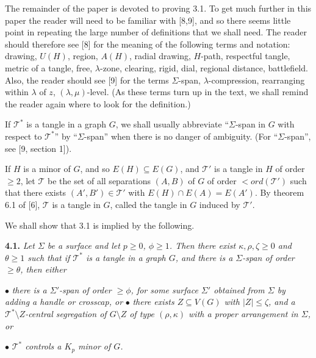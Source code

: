 The remainder of the paper is devoted to proving 3.1. To get much further in this paper the reader will need to be familiar with [8,9], and so there seems little point in repeating the large number of definitions that we shall need. The reader should therefore see [8] for the meaning of the following terms and notation: drawing, $U(H)$, region, $A(H)$, radial drawing, $H$-path, respectful tangle, metric of a tangle, free, $\lambda$-zone, clearing, rigid, dial, regional distance, battlefield. Also, the reader should see [9] for the terms $\Sigma$-span, $\lambda$-compression, rearranging within $\lambda$ of $z$, $(\lambda, \mu)$-level. (As these terms turn up in the text, we shall remind the reader again where to look for the definition.)

If $\mathscr{T}^*$ is a tangle in a graph $G$, we shall usually abbreviate ``$\Sigma$-span in $G$ with respect to $\mathscr{T}^*$'' by ``$\Sigma$-span'' when there is no danger of ambiguity. (For ``$\Sigma$-span'', see [9, section 1]).

If $H$ is a minor of $G$, and so $E(H) \subseteq E(G)$, and $\mathscr{T}'$ is a tangle in $H$ of order $\ge 2$, let $\mathscr{T}$ be the set of all separations $(A, B)$ of $G$ of order $< ord(\mathscr{T}')$ such that there exists $(A', B') \in \mathscr{T}'$ with $E(H) \cap E(A) = E(A')$. By theorem 6.1 of [6], $\mathscr{T}$ is a tangle in $G$, called the tangle in $G$ induced by $\mathscr{T}'$.

We shall show that 3.1 is implied by the following.

\textbf{4.1.} \textit{Let $\Sigma$ be a surface and let $p \ge 0$, $\phi \ge 1$. Then there exist $\kappa, \rho, \zeta \ge 0$ and $\theta \ge 1$ such that if $\mathscr{T}^*$ is a tangle in a graph $G$, and there is a $\Sigma$-span of order $\ge \theta$, then either}

\hspace*{12pt}$\bullet$ \textit{there is a $\Sigma'$-span of order $\ge \phi$, for some surface $\Sigma'$ obtained from $\Sigma$ by adding a handle or crosscap, or} $\bullet$ \textit{there exists $Z \subseteq V(G)$ with $|Z| \le \zeta$, and a $\mathscr{T}^* \setminus Z$-central segregation of $G \setminus Z$ of type $(\rho, \kappa)$ with a proper arrangement in $\Sigma$, or}

\hspace*{12pt}$\bullet$ \textit{$\mathscr{T}^*$ controls a $K_p$ minor of $G$.}
